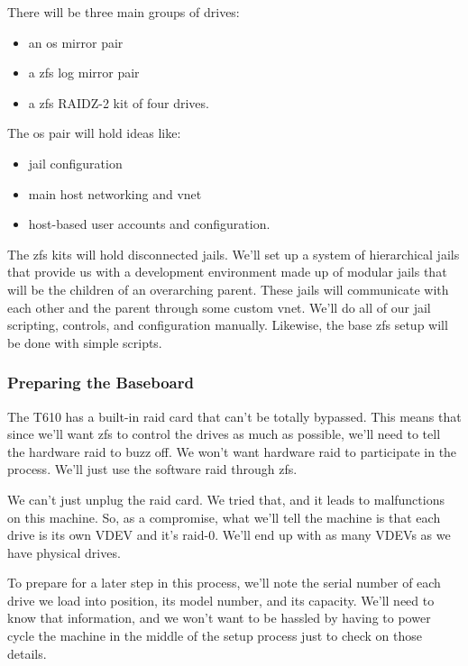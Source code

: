 There will be three main groups of drives:
\begin{itemize}
	\item an \gls{os} \Gls{mirror} pair
	\item a \gls{zfs} log \Gls{mirror} pair
	\item a \gls{zfs} RAIDZ-2 kit of four drives.
\end{itemize}

The \gls{os} pair will hold ideas like:
\begin{itemize}
	\item \gls{jail} \gls{configuration}
	\item main host networking and \gls{vnet}
	\item host-based user accounts and \gls{configuration}.
\end{itemize}

The  \gls{zfs} kits will hold disconnected jails.  We'll set up a system of hierarchical jails that provide us with a development environment made up of modular jails that will be the children of an overarching parent.  These jails will communicate with each other and the parent through some custom \gls{vnet}.  We'll do all of our \gls{jail} scripting, controls, and \gls{configuration} manually.  Likewise, the base  \gls{zfs} setup will be done with simple scripts.


\subsubsection{Preparing the Baseboard}

The T610 has a built-in  \gls{raid} card that can't be totally bypassed.  This means that since we'll want  \gls{zfs} to control the drives as much as possible, we'll need to tell the hardware  \gls{raid} to buzz off.  We won't want hardware  \gls{raid} to participate in the process.  We'll just use the software  \gls{raid} through  \gls{zfs}.

We can't just unplug the  \gls{raid} card.  We tried that, and it leads to malfunctions on this machine.  So, as a compromise, what we'll tell the machine is that each drive is its own VDEV and it's  \gls{raid}-0.  We'll end up with as many VDEVs as we have physical drives.

To prepare for a later step in this process, we'll note the serial number of each drive we load into position, its model number, and its capacity.  We'll need to know that information, and we won't want to be hassled by having to power cycle the machine in the middle of the setup process just to check on those details.

